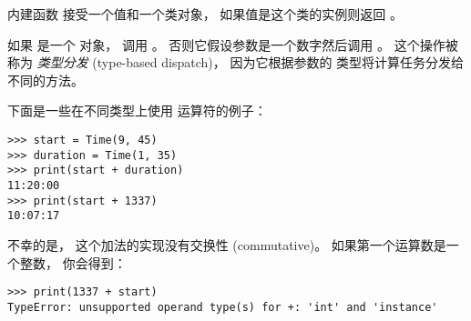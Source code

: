%

内建函数  接受一个值和一个类对象，
如果值是这个类的实例则返回  。
  


如果  是一个  对象，  调用  。
否则它假设参数是一个数字然后调用  。
这个操作被称为 {\em 类型分发} (type-based dispatch)，  因为它根据参数的
类型将计算任务分发给不同的方法。

  


下面是一些在不同类型上使用 \li{+} 运算符的例子：

\begin{lstlisting}
>>> start = Time(9, 45)
>>> duration = Time(1, 35)
>>> print(start + duration)
11:20:00
>>> print(start + 1337)
10:07:17
\end{lstlisting}

%

不幸的是， 这个加法的实现没有交换性 (commutative)。
如果第一个运算数是一个整数， 你会得到：


\begin{lstlisting}
>>> print(1337 + start)
TypeError: unsupported operand type(s) for +: 'int' and 'instance'
\end{lstlisting}

%

